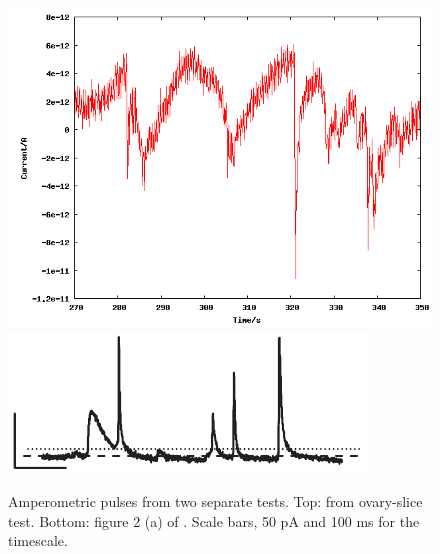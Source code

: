 \begin{figure}
	\centering
	\includegraphics[width=0.7\linewidth]{figures/216.png}
	\includegraphics[width=0.7\linewidth]{figures/mosharok-pulse.png}
	\caption[Amperometric pulses.]{Amperometric pulses from two separate tests. Top: from ovary-slice test. Bottom: figure 2 (a) of \cite{mosharok2005aee}. Scale bars, 50 pA and 100 ms for the timescale.}
	\label{amperometric-pulses}
\end{figure}
